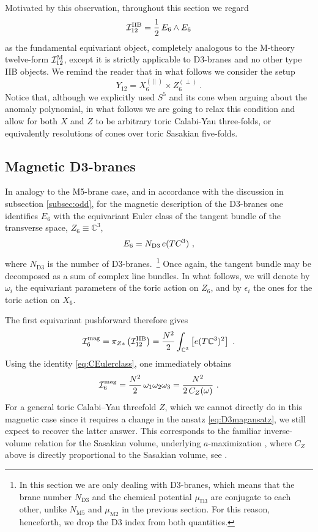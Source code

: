 \documentclass[11pt,a4paper]{article}
\def\cI{{\cal I}}
\theoremstyle{definition}
\theoremstyle{identity}
\theoremstyle{remark}
\newcommand{\be}{\begin{equation}}
\newcommand{\ee}{\end{equation}}
\newcommand{\BC}{\mathbb{C}}
\begin{document}
Motivated by this observation, throughout this section we regard
\be
\cI_{12}^{\rm IIB}
=
\frac12\, E_6\wedge E_6
\ee
as the fundamental equivariant object, completely analogous to the M-theory twelve-form
$\cI_{12}^{\rm M}$, except it is strictly applicable to D3-branes and no other type IIB objects. We remind the reader that in what follows we consider the setup
\be
Y_{12}=X_6^{(\parallel)}\times Z_6^{(\perp)}\ .
\ee
Notice that, although we explicitly used $S^5$ and its cone when arguing about the anomaly polynomial, in what follows we are going to relax this condition and allow for both $X$ and $Z$ to be arbitrary toric Calabi-Yau three-folds, or equivalently resolutions of cones over toric Sasakian five-folds.


\subsection{Magnetic D3-branes}
In analogy to the M5-brane case, and in accordance with the discussion in subsection \ref{subsec:odd}, for the magnetic description of the D3-branes one identifies $E_6$ with the equivariant Euler class of the tangent bundle of the transverse space, $Z_6\equiv \mathbb{C}^3$,
\be
\label{eq:D3magansatz}
E_6=N_\text{D3}\,e (T\mathbb \BC^3)\ ,
\ee
where $N_\text{D3}$ is the number of D3-branes.~\footnote{In this section we are only dealing with D3-branes, which means that the brane number $N_\text{D3}$ and the chemical potential $\mu_\text{D3}$ are conjugate to each other, unlike $N_\text{M5}$ and $\mu_\text{M2}$ in the previous section. For this reason, henceforth, we drop the D3 index from both quantities.}
Once again, the tangent bundle may be decomposed as a sum of complex line bundles. In what follows, we will denote by $\omega_i$ the equivariant parameters of the toric action on $Z_6$, and by $\epsilon_i$ the ones for the toric action on $X_6$.

The first equivariant pushforward therefore gives
\be
\cI_6^{\rm mag}
=
\pi_{Z*} \left( \cI_{12}^{\rm IIB} \right)
=
\frac{N^2}{2}
\int_{\mathbb C^3}
\left[e(T\mathbb C^3)^2\right]\ .
\ee
Using the identity \eqref{eq:CEulerclass},
one immediately obtains
\be\label{I_6^mag}
\cI_6^{\rm mag}
=
\frac{N^2}{2}\,
\omega_1\omega_2\omega_3 = \frac{N^2}{2\, C_Z(\omega)}\ .
\ee
For a general toric Calabi--Yau threefold $Z$, which we cannot directly do in this magnetic case since it requires a change in the ansatz \eqref{eq:D3magansatz}, we still expect to recover the latter answer. This corresponds to the familiar inverse-volume relation for the Sasakian volume, underlying
$a$-maximization
\cite{Martelli:2005tp,Martelli:2006yb,Butti:2005vn,Lee:2006ru,Benvenuti:2006xg}, where $C_Z$ above is directly proportional to the Sasakian volume, see \cite{Martelli:2023oqk}. 
\end{document}

